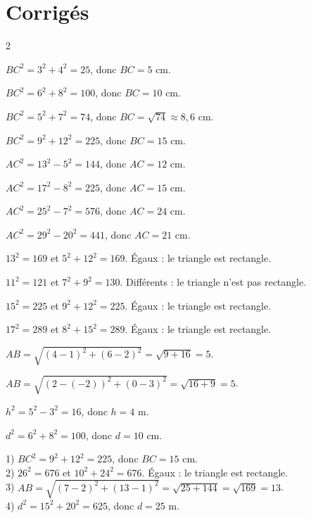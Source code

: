 \section{Corrigés}
\begin{multicols}{2}

$BC^{2}=3^{2}+4^{2}=25$, donc $BC=5$ cm.

$BC^{2}=6^{2}+8^{2}=100$, donc $BC=10$ cm.

$BC^{2}=5^{2}+7^{2}=74$, donc $BC=\sqrt{74}\approx8{,}6$ cm.

$BC^{2}=9^{2}+12^{2}=225$, donc $BC=15$ cm.

$AC^{2}=13^{2}-5^{2}=144$, donc $AC=12$ cm.

$AC^{2}=17^{2}-8^{2}=225$, donc $AC=15$ cm.

$AC^{2}=25^{2}-7^{2}=576$, donc $AC=24$ cm.

$AC^{2}=29^{2}-20^{2}=441$, donc $AC=21$ cm.

$13^{2}=169$ et $5^{2}+12^{2}=169$. Égaux : le triangle est rectangle.

$11^{2}=121$ et $7^{2}+9^{2}=130$. Différents : le triangle n'est pas rectangle.

$15^{2}=225$ et $9^{2}+12^{2}=225$. Égaux : le triangle est rectangle.

$17^{2}=289$ et $8^{2}+15^{2}=289$. Égaux : le triangle est rectangle.

$AB=\sqrt{(4-1)^{2}+(6-2)^{2}}=\sqrt{9+16}=5$.

$AB=\sqrt{(2-(-2))^{2}+(0-3)^{2}}=\sqrt{16+9}=5$.

$h^{2}=5^{2}-3^{2}=16$, donc $h=4$ m.

$d^{2}=6^{2}+8^{2}=100$, donc $d=10$ cm.

1) $BC^{2}=9^{2}+12^{2}=225$, donc $BC=15$ cm.\\
2) $26^{2}=676$ et $10^{2}+24^{2}=676$. Égaux : le triangle est rectangle.\\
3) $AB=\sqrt{(7-2)^{2}+(13-1)^{2}}=\sqrt{25+144}=\sqrt{169}=13$.\\
4) $d^{2}=15^{2}+20^{2}=625$, donc $d=25$ m.


\end{multicols}

